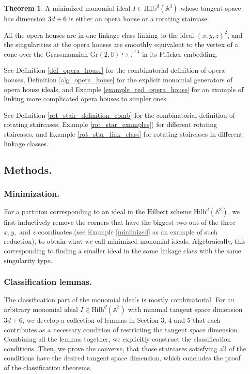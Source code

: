 \documentclass{amsart}[10pt]
\theoremstyle{plain}
\theoremstyle{definition}
\newtheorem{theorem}{Theorem}[section]
\newcommand{\Hilb}{\mathrm{Hilb}}
\begin{document}
\begin{theorem}
A minimized monomial ideal $I \in \Hilb^d(\mathbb{A}^3)$ whose tangent space has dimension $3d+6$ is either an opera house or a rotating staircase. 

All the opera houses are in one linkage class linking to the ideal $(x,y,z)^2$, and the singularities at the opera houses are smoothly equivalent to the vertex of a cone over the Grassmannian
$\mathrm{Gr}(2,6) \hookrightarrow \mathbb{P}^{14}$ in its Pl\"ucker embedding.
\end{theorem} 

See Definition \ref{def_opera_house} for the combinatorial definition of opera houses, Definition \ref{alg_opera_house} for the explicit monomial generators of opera house ideals, and Example \ref{example_red_opera_house} for an example of linking more complicated opera houses to simpler ones. 

See Definition \ref{rot_stair_definition_comb} for the combinatorial definition of rotating staircases, Example \ref{rot_star_examples}) for different rotating staircases, and Example \ref{rot_star_link_class} for rotating staircases in different linkage classes.
 
\subsection{Methods.}\subsubsection{Minimization.}
For a partition corresponding to an ideal in the Hilbert scheme $\Hilb^d(\mathbb{A}^3)$, we first inductively remove the corners that have the biggest two out of the three $x,y,$ and $z$ coordinates (see Example \ref{minimized} as an example of such reduction), to obtain what we call minimized monomial ideals. Algebraically, this corresponding to finding a smaller ideal in the same linkage class with the same singularity type.

\subsubsection{Classification lemmas.}The classification part of the monomial ideals is mostly combinatorial. For an arbitrary monomial ideal $I \in \Hilb^d(\mathbb{A}^3)$ with minimal tangent space dimension $3d+6$, we develop a collection of lemmas in Section 3, 4 and 5 that each contributes as a necessary condition of restricting the tangent space dimension. Combining all the lemmas together, we explicitly construct the classification conditions. Then, we prove the converse, that those staircases satisfying all of the conditions have the desired tangent space dimension, which concludes the proof of the classification theorems.
\end{document}
